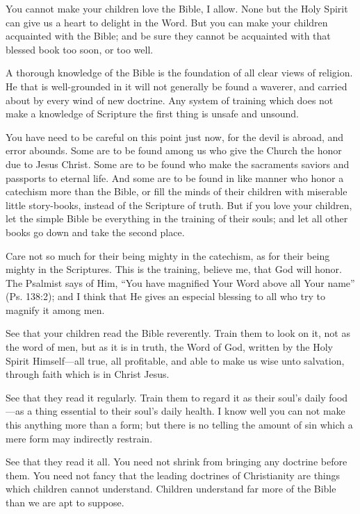\documentclass[
]{book}
\begin{document}
You cannot make your children love the Bible, I allow. None but the Holy Spirit can give us a heart to delight in the Word. But you can make your children acquainted with the Bible; and be sure they cannot be acquainted with that blessed book too soon, or too well.

A thorough knowledge of the Bible is the foundation of all clear views of religion. He that is well-grounded in it will not generally be found a waverer, and carried about by every wind of new doctrine. Any system of training which does not make a knowledge of Scripture the first thing is unsafe and unsound.

You have need to be careful on this point just now, for the devil is abroad, and error abounds. Some are to be found among us who give the Church the honor due to Jesus Christ. Some are to be found who make the sacraments saviors and passports to eternal life. And some are to be found in like manner who honor a catechism more than the Bible, or fill the minds of their children with miserable little story-books, instead of the Scripture of truth. But if you love your children, let the simple Bible be everything in the training of their souls; and let all other books go down and take the second place.

Care not so much for their being mighty in the catechism, as for their being mighty in the Scriptures. This is the training, believe me, that God will honor. The Psalmist says of Him, ``You have magnified Your Word above all Your name'' (Ps. 138:2); and I think that He gives an especial blessing to all who try to magnify it among men.

See that your children read the Bible reverently. Train them to look on it, not as the word of men, but as it is in truth, the Word of God, written by the Holy Spirit Himself---all true, all profitable, and able to make us wise unto salvation, through faith which is in Christ Jesus.

See that they read it regularly. Train them to regard it as their soul's daily food---as a thing essential to their soul's daily health. I know well you can not make this anything more than a form; but there is no telling the amount of sin which a mere form may indirectly restrain.

See that they read it all. You need not shrink from bringing any doctrine before them. You need not fancy that the leading doctrines of Christianity are things which children cannot understand. Children understand far more of the Bible than we are apt to suppose.
\end{document}
